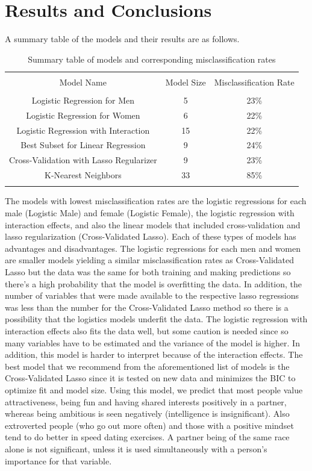 \documentclass{article}
\begin{document}
\section{Results and Conclusions}
A summary table of the models and their results are as follows.
\begin{table}[!htbp] \centering 
	\caption{Summary table of models and corresponding misclassification rates} 
	\label{table:results} 
	\begin{tabular}{ccc} 
		\\[-1.8ex]\hline 
		\hline \\[-1.8ex] 
		Model Name & Model Size & Misclassification Rate \\ 
		\hline \\[-1.8ex] 
		Logistic Regression for Men & 5 & 23\% \\ 
		Logistic Regression for Women &6 & 22\% \\ 
		Logistic Regression with Interaction & 15 & 22\%\\
		Best Subset for Linear Regression& 9 & 24\% \\
		Cross-Validation with Lasso Regularizer & 9 & 23\% \\
		K-Nearest Neighbors & 33 & 85\% \\  
		\hline \\[-1.8ex] 
	\end{tabular} 
\end{table} 
The models with lowest misclassification rates are the logistic regressions for each male (Logistic Male) and female (Logistic Female), the logistic regression with interaction effects, and also the linear models that included cross-validation and lasso regularization (Cross-Validated Lasso).  Each of these types of models has advantages and disadvantages.  The logistic regressions for each men and women are smaller models yielding a similar misclassification rates as Cross-Validated Lasso but the data was the same for both training and making predictions so there's a high probability that the model is overfitting the data.  In addition, the number of variables that were made available to the respective lasso regressions was less than the number for the Cross-Validated Lasso method so there is a possibility that the logistics models underfit the data.  The logistic regression with interaction effects also fits the data well, but some caution is needed since so many variables have to be estimated and the variance of the model is higher.  In addition, this model is harder to interpret because of the interaction effects.  The best model that we recommend from the aforementioned list of models is the Cross-Validated Lasso since it is tested on new data and minimizes the BIC to optimize fit and model size. Using this model, we predict that most people value attractiveness, being fun and having shared interests positively in a partner, whereas being ambitious is seen negatively (intelligence is insignificant). Also extroverted people (who go out more often) and those with a positive mindset tend to do better in speed dating exercises. A partner being of the same race alone is not significant, unless it is used simultaneously with a person's importance for that variable.
\end{document}
